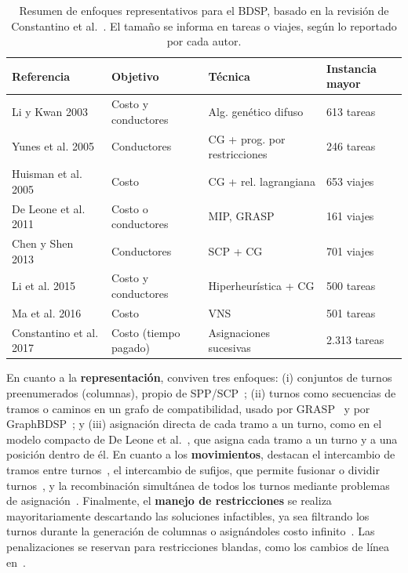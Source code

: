 \documentclass[letter, 10pt]{article}
\begin{document}
\begin{table}[ht]
\centering
\small
\caption{Resumen de enfoques representativos para el BDSP, basado en la revisión de Constantino et al.~\cite{Constantino2017}. El tamaño se informa en tareas o viajes, según lo reportado por cada autor.}
\label{tab:resumen}
\setlength{\tabcolsep}{4pt}
\begin{tabular}{@{}llll@{}}
\toprule
Referencia & Objetivo & Técnica & Instancia mayor \\
\midrule
Li y Kwan 2003~\cite{LiKwan2003} & Costo y conductores & Alg. genético difuso & 613 tareas \\
Yunes et al. 2005~\cite{Yunes2005} & Conductores & CG + prog. por restricciones & 246 tareas \\
Huisman et al. 2005~\cite{Huisman2005} & Costo & CG + rel. lagrangiana & 653 viajes \\
De Leone et al. 2011~\cite{DeLeone2011a} & Costo o conductores & MIP, GRASP & 161 viajes \\
Chen y Shen 2013~\cite{ChenShen2013} & Conductores & SCP + CG & 701 viajes \\
Li et al. 2015~\cite{Li2015} & Costo y conductores & Hiperheurística + CG & 500 tareas \\
Ma et al. 2016~\cite{Ma2016} & Costo & VNS & 501 tareas \\
Constantino et al. 2017~\cite{Constantino2017} & Costo (tiempo pagado) & Asignaciones sucesivas & 2.313 tareas \\
\bottomrule
\end{tabular}
\end{table}

En cuanto a la \textbf{representación}, conviven tres enfoques: (i) conjuntos de turnos preenumerados (columnas), propio de SPP/SCP~\cite{Portugal2009}; (ii) turnos como secuencias de tramos o caminos en un grafo de compatibilidad, usado por GRASP~\cite{DeLeone2011a} y por GraphBDSP~\cite{Constantino2017}; y (iii) asignación directa de cada tramo a un turno, como en el modelo compacto de De Leone et al.~\cite{DeLeone2011a}, que asigna cada tramo a un turno y a una posición dentro de él. En cuanto a los \textbf{movimientos}, destacan el intercambio de tramos entre turnos~\cite{Lourenco2001,DeLeone2011a}, el intercambio de sufijos, que permite fusionar o dividir turnos~\cite{DeLeone2011a}, y la recombinación simultánea de todos los turnos mediante problemas de asignación~\cite{Constantino2017}. Finalmente, el \textbf{manejo de restricciones} se realiza mayoritariamente descartando las soluciones infactibles, ya sea filtrando los turnos durante la generación de columnas o asignándoles costo infinito~\cite{Constantino2017}. Las penalizaciones se reservan para restricciones blandas, como los cambios de línea en~\cite{Constantino2017}.
\end{document}
